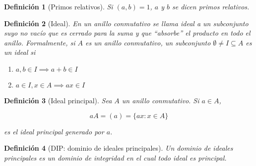 \documentclass[11pt, a4paper, titlepage]{article}
\theoremstyle{theorem-style}
\theoremstyle{definition-style}
\newtheorem*{ndef}{Definición}
\theoremstyle{remark-style}
\theoremstyle{example-style}
\newenvironment{nlist}
{\begin{enumerate}
\renewcommand\labelenumi{(\emph{\roman{enumi})}}}
{\end{enumerate}}
\begin{document}
\begin{ndef}[Primos relativos]
  Si $(a,b) = 1$, $a$ y $b$ se dicen \emph{primos relativos}.
\end{ndef}

\begin{ndef}[Ideal]
  En un anillo conmutativo se llama ideal a un subconjunto suyo no vacío que es cerrado para la suma y que ``absorbe'' el producto en todo
  el anillo. Formalmente, si $A$ es un anillo conmutativo, un subconjunto $\emptyset \not= I\subseteq A$ es un ideal si
	\begin{nlist}
		\item $a,b\in I \implies a+b\in I$
		\item $a\in I, x\in A \implies ax \in I$
	\end{nlist}
\end{ndef}

\begin{ndef}[Ideal principal]
  Sea $A$ un anillo conmutativo. Si $a\in A$,

  $$aA=(a)=\{ax: x\in A\}$$

  es el ideal principal generado por $a$.
\end{ndef}

\begin{ndef}[DIP: dominio de ideales principales]
	Un dominio de ideales principales es un dominio de integridad en el cual todo ideal es principal.
\end{ndef}
\end{document}
